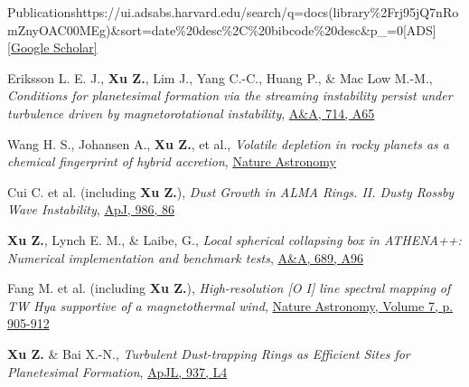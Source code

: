 \documentclass{resume} %
\begin{document}
\begin{rSectionLink}
{Publications}{https://ui.adsabs.harvard.edu/search/q=docs(library\%2Frj95jQ7nRomZnyOAC00MEg)\&sort=date\%20desc\%2C\%20bibcode\%20desc\&p_=0}{[ADS]}{\href{https://scholar.google.com/citations?user=Qf4qJ54AAAAJ}{[Google Scholar]}}\itemsep -3pt

\begin{list}{}{%
  \settowidth{\labelwidth}{2026}%
  \setlength{\labelsep}{0.6em}%
  \setlength{\leftmargin}{\dimexpr\labelwidth+\labelsep\relax}%
  \setlength{\itemsep}{0.65em}%
  \setlength{\parsep}{0pt}%
  \setlength{\topsep}{0.3em}%
}

\item[2026] Eriksson L. E. J., \textbf{Xu Z.}, Lim J., Yang C.-C., Huang P., \& Mac Low M.-M., \emph{Conditions for planetesimal formation via the streaming instability persist under turbulence driven by magnetorotational instability}, \href{https://ui.adsabs.harvard.edu/abs/2026A\%26A...714A..65E/abstract}{A\&A, 714, A65}

\item[2026] Wang H. S., Johansen A., \textbf{Xu Z.}, et al., \emph{Volatile depletion in rocky planets as a chemical fingerprint of hybrid accretion},
                                \href{https://ui.adsabs.harvard.edu/abs/arXiv:2608.24407}{Nature Astronomy}

\item[2025] Cui C. et al. (including \textbf{Xu Z.}), \emph{Dust Growth in ALMA Rings. II. Dusty Rossby Wave Instability}, \href{https://ui.adsabs.harvard.edu/abs/2025ApJ...986...86C/abstract}{ApJ, 986, 86}

\item[2024] \textbf{Xu Z.}, Lynch E. M., \& Laibe, G., \emph{Local spherical collapsing box in ATHENA++: Numerical implementation and benchmark tests}, \href{https://ui.adsabs.harvard.edu/abs/2024A\%26A...689A..96X/abstract}{A\&A, 689, A96}

\item[2023] Fang M. et al. (including \textbf{Xu Z.}), \emph{High-resolution [O I] line spectral mapping of TW Hya supportive of a magnetothermal wind}, \href{https://ui.adsabs.harvard.edu/abs/2023NatAs.tmp..121F/abstract}{Nature Astronomy, Volume 7, p. 905-912}

\item[2022] \textbf{Xu Z.} \& Bai X.-N., \emph{Turbulent Dust-trapping Rings as Efficient Sites for Planetesimal Formation}, \href{https://ui.adsabs.harvard.edu/abs/2022ApJ...937L...4X/abstract}{ApJL, 937, L4}


\end{list}
\end{rSectionLink}
\end{document}

